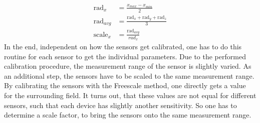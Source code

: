 \begin{equation} \label{eq:simpleScale}
\begin{aligned}
\mathrm{rad}_{x} &= \frac{x_{max} - x_{min}}{2}\\
\mathrm{rad}_{avg} &= \frac{\mathrm{rad}_{x} + \mathrm{rad}_{y} + \mathrm{rad}_{z}}{3}\\
\mathrm{scale}_{x} &= \frac{\mathrm{rad}_{avg}}{rad_{x}}
\end{aligned}
\end{equation}
In the end, independent on how the sensors get calibrated, one has to do this routine for each sensor to get the individual parameters. Due to the performed calibration procedure, the measurement range of the sensor is slightly varied. As an additional step, the sensors have to be scaled to the same measurement range. By calibrating the sensors with the Freescale method, one directly gets a value for the surrounding field. It turns out, that these values are not equal for different sensors, such that each device has slightly another sensitivity. So one has to determine a scale factor, to bring the sensors onto the same measurement range.


